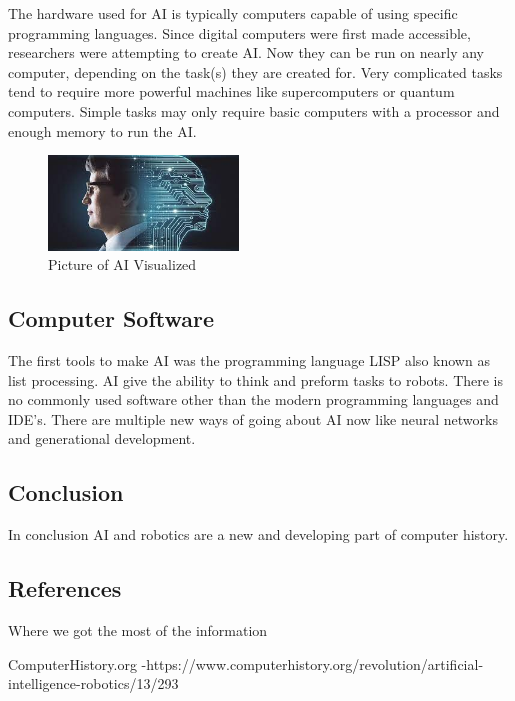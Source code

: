 \documentclass[11pt, twocolumn]{article}
\begin{document}
The hardware used for AI is typically computers capable of using specific programming
languages. Since digital computers were first made accessible, researchers were
attempting to create AI. Now they can be run on nearly any computer, depending on the
task(s) they are created for. Very complicated tasks tend to require more powerful
machines like supercomputers or quantum computers. Simple tasks may only require
basic computers with a processor and enough memory to run the AI.

\begin{figure}
    \centering
    \includegraphics[width=0.45\textwidth]{AI}
    \caption{Picture of AI Visualized}
    \label{fig:AI}
\end{figure}

\subsection{Computer Software}
The first tools to make AI was the programming language LISP also known as list
processing. AI give the ability to think and preform tasks to robots. There is no
commonly used software other than the modern programming languages and IDE's. There
are multiple new ways of going about AI now like neural networks and generational
development.

\subsection{Conclusion}
In conclusion AI and robotics are a new and developing part of computer history. 




\subsection{References}
Where we got the most of the information

ComputerHistory.org 
-https://www.computerhistory.org/revolution/artificial-intelligence-robotics/13/293
\end{document}

